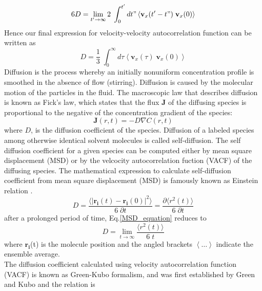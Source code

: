  \begin{equation}
  6 D = \lim \limits_{t'\to\infty} 2\;\int_0^{t'} dt" \left\langle \mathbf{v}_x(t'-t")\;\mathbf{v}_x(0) \right\rangle
 \end{equation}
 \noindent Hence our final expression for velocity-velocity autocorrelation function can be written as
 \begin{equation}
 D = \frac{1}{3} \;\int_0^\infty d\tau \left\langle \mathbf{v}_x(\tau)\;\mathbf{v}_x(0) \right\rangle
 \end{equation}  
 \noindent Diffusion is the process whereby an initially nonuniform concentration profile is smoothed in the absence of flow (stirring). Diffusion is caused by the molecular motion of the particles in the fluid. The macroscopic law that describes diffusion is known as Fick's law, which states that the flux $\mathbf{J}$ of the diffusing species is proportional to the negative of the concentration gradient of the species\citep{frenkel}:
 \begin{equation}
 \mathbf{J}(r,t) = -D \nabla C(r,t)
 \end{equation}
 where $D$, is the diffusion coefficient of the species.  Diffusion of a labeled species among otherwise identical solvent molecules is called self-diffusion. The self diffusion coefficient for a given species can be computed   either by mean square displacement (MSD) or by the velcocity autocorrelation fuction (VACF) of the diffusing species. The mathematical expression to calculate self-diffusion coefficient from mean square displacement (MSD)  is famously known as Einstein relation \cite{frenkel, allen}.
 \begin{equation}\label{MSD_equation}
 D=  \frac{\langle |\mathbf{r_i}(t) -\mathbf{r_i}(0)|^2 \rangle}{6\; \partial t}= \frac{\partial \langle {r}^2(t) \rangle}{6\; \partial t}
 \end{equation}
 after a prolonged period of time, Eq.\ref{MSD_equation} 
 reduces to
 \begin{equation}
 D= \lim_{t \rightarrow \infty} \frac{\langle r^2(t) \rangle}{6\; t}
 \label{MSD}
 \end{equation}
 \noindent where $\mathbf{r_i}$(t)  is the molecule position and the angled brackets $\left\langle \ldots \right\rangle$ indicate the ensemble average.\\ 
 \noindent 
 The diffusion coefficient calculated using velocity autocorrelation function (VACF)  is known as Green-Kubo formalism, and was first established by Green and Kubo and the relation is \cite{frenkel, allen}
